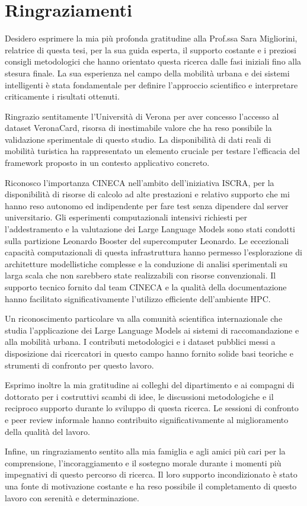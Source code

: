 \section{Ringraziamenti}

Desidero esprimere la mia più profonda gratitudine alla Prof.ssa Sara Migliorini, relatrice di questa tesi, per la sua guida esperta, il supporto costante e i preziosi consigli metodologici che hanno orientato questa ricerca dalle fasi iniziali fino alla stesura finale. La sua esperienza nel campo della mobilità urbana e dei sistemi intelligenti è stata fondamentale per definire l'approccio scientifico e interpretare criticamente i risultati ottenuti.

Ringrazio sentitamente l'Università di Verona per aver concesso l'accesso al dataset VeronaCard, risorsa di inestimabile valore che ha reso possibile la validazione sperimentale di questo studio. La disponibilità di dati reali di mobilità turistica ha rappresentato un elemento cruciale per testare l'efficacia del framework proposto in un contesto applicativo concreto.

Riconosco l'importanza CINECA nell'ambito dell'iniziativa ISCRA, per la disponibilità di risorse di calcolo ad alte prestazioni e relativo supporto che mi hanno reso autonomo ed indipendente per fare test senza dipendere dal server universitario. Gli esperimenti computazionali intensivi richiesti per l'addestramento e la valutazione dei Large Language Models sono stati condotti sulla partizione Leonardo Booster del supercomputer Leonardo. Le eccezionali capacità computazionali di questa infrastruttura hanno permesso l'esplorazione di architetture modellistiche complesse e la conduzione di analisi sperimentali su larga scala che non sarebbero state realizzabili con risorse convenzionali. Il supporto tecnico fornito dal team CINECA e la qualità della documentazione hanno facilitato significativamente l'utilizzo efficiente dell'ambiente HPC.

Un riconoscimento particolare va alla comunità scientifica internazionale che studia l'applicazione dei Large Language Models ai sistemi di raccomandazione e alla mobilità urbana. I contributi metodologici e i dataset pubblici messi a disposizione dai ricercatori in questo campo hanno fornito solide basi teoriche e strumenti di confronto per questo lavoro.

Esprimo inoltre la mia gratitudine ai colleghi del dipartimento e ai compagni di dottorato per i costruttivi scambi di idee, le discussioni metodologiche e il reciproco supporto durante lo sviluppo di questa ricerca. Le sessioni di confronto e peer review informale hanno contribuito significativamente al miglioramento della qualità del lavoro.

Infine, un ringraziamento sentito alla mia famiglia e agli amici più cari per la comprensione, l'incoraggiamento e il sostegno morale durante i momenti più impegnativi di questo percorso di ricerca. Il loro supporto incondizionato è stato una fonte di motivazione costante e ha reso possibile il completamento di questo lavoro con serenità e determinazione.